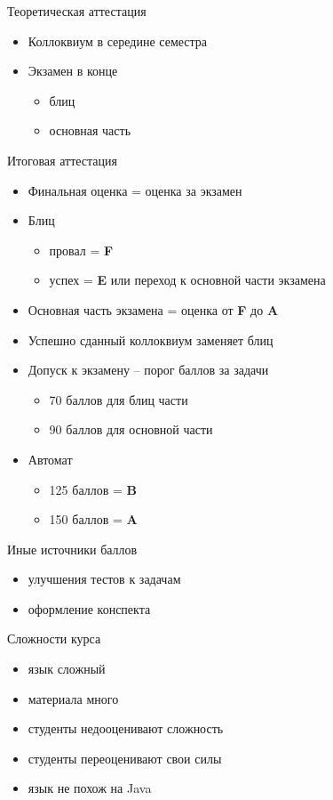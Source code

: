 \documentclass[unknownkeysallowed,xcolor=table]{beamer}
\begin{document}
\begin{frame}{Теоретическая аттестация}
  \begin{itemize}
    \item Коллоквиум в середине семестра
    \item Экзамен в конце
      \begin{itemize}
        \item блиц
        \item основная часть
      \end{itemize}
  \end{itemize}
\end{frame}

\begin{frame}{Итоговая аттестация}
  \begin{itemize}
    \item Финальная оценка = оценка за экзамен
    \item Блиц
      \begin{itemize}
        \item провал = \textbf{F}
        \item успех = \textbf{E} или переход к основной части экзамена
      \end{itemize}
    \item Основная часть экзамена = оценка от \textbf{F} до \textbf{A}
    \item Успешно сданный коллоквиум заменяет блиц
    \item Допуск к экзамену -- порог баллов за задачи
      \begin{itemize}
        \item 70 баллов для блиц части
        \item 90 баллов для основной части
      \end{itemize}
    \item Автомат
      \begin{itemize}
        \item 125 баллов = \textbf{B}
        \item 150 баллов = \textbf{A}
      \end{itemize}
  \end{itemize}
\end{frame}

\begin{frame}{Иные источники баллов}
  \begin{itemize}
    \item улучшения тестов к задачам \vspace{2em}
    \item оформление конспекта
  \end{itemize}
\end{frame}

\begin{frame}{Сложности курса}
  \begin{itemize}
    \item язык сложный \vspace{1em}
    \item материала много \vspace{1em}
    \item студенты недооценивают сложность \vspace{1em}
    \item студенты переоценивают свои силы \vspace{1em}
    \item язык не похож на Java
  \end{itemize}
\end{frame}
\end{document}
